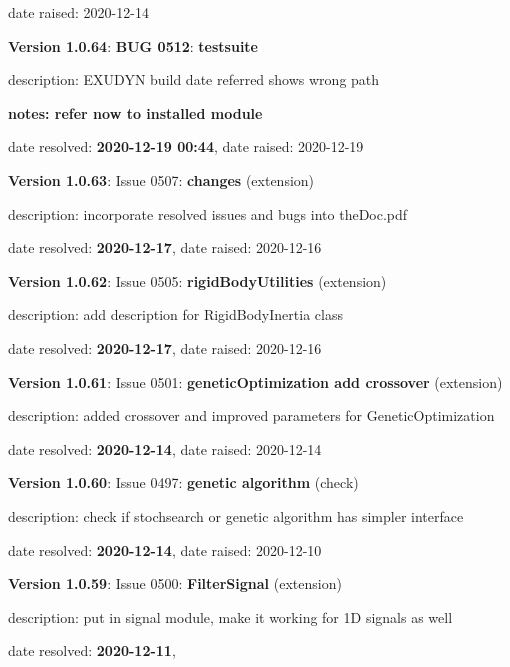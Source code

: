 date raised: 2020-12-14   \ei
  \item {\bf Version 1.0.64}: \vspace{-6pt} 
{\bf \color{warningRed}  BUG 0512}: {\bf testsuite}
  \bi
  \item {\small description: EXUDYN build date referred shows wrong path}
  \item {\small \bf notes: refer now to installed module}
  \item   date resolved: {\bf 2020-12-19 00:44},
date raised: 2020-12-19   \ei
  \item {\bf Version 1.0.63}: \vspace{-6pt} 
  Issue 0507: {\bf changes}
(extension)
  \bi
  \item {\small description: incorporate resolved issues and bugs into theDoc.pdf}
  \item   date resolved: {\bf 2020-12-17},
date raised: 2020-12-16   \ei
  \item {\bf Version 1.0.62}: \vspace{-6pt} 
  Issue 0505: {\bf rigidBodyUtilities}
(extension)
  \bi
  \item {\small description: add description for RigidBodyInertia class}
  \item   date resolved: {\bf 2020-12-17},
date raised: 2020-12-16   \ei
  \item {\bf Version 1.0.61}: \vspace{-6pt} 
  Issue 0501: {\bf geneticOptimization add crossover}
(extension)
  \bi
  \item {\small description: added crossover and improved parameters for GeneticOptimization}
  \item   date resolved: {\bf 2020-12-14},
date raised: 2020-12-14   \ei
  \item {\bf Version 1.0.60}: \vspace{-6pt} 
  Issue 0497: {\bf genetic algorithm}
(check)
  \bi
  \item {\small description: check if stochsearch or genetic algorithm has simpler interface}
  \item   date resolved: {\bf 2020-12-14},
date raised: 2020-12-10   \ei
  \item {\bf Version 1.0.59}: \vspace{-6pt} 
  Issue 0500: {\bf FilterSignal}
(extension)
  \bi
  \item {\small description: put in signal module, make it working for 1D signals as well}
  \item   date resolved: {\bf 2020-12-11},
